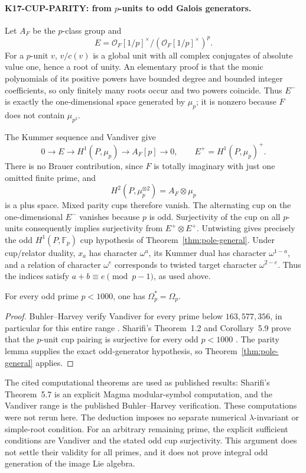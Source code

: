\paragraph{K17-CUP-PARITY: from $p$-units to odd Galois generators.}
Let $A_F$ be the $p$-class group and
\[
 E=\mathcal O_F[1/p]^\times/(\mathcal O_F[1/p]^\times)^p.
\]
For a $p$-unit $v$, $v/c(v)$ is a global unit with all complex conjugates of absolute value one, hence a root of unity. An elementary proof is that the monic polynomials of its positive powers have bounded degree and bounded integer coefficients, so only finitely many roots occur and two powers coincide. Thus $E^-$ is exactly the one-dimensional space generated by $\mu_p$; it is nonzero because $F$ does not contain $\mu_{p^2}$.

The Kummer sequence and Vandiver give
\[
 0\longrightarrow E\longrightarrow H^1(P,\mu_p)
  \longrightarrow A_F[p]\longrightarrow0,
 \qquad E^+=H^1(P,\mu_p)^+.
\]
There is no Brauer contribution, since $F$ is totally imaginary with just one omitted finite prime, and
\[
 H^2(P,\mu_p^{\otimes2})=A_F\otimes\mu_p
\]
is a plus space. Mixed parity cups therefore vanish. The alternating cup on the one-dimensional $E^-$ vanishes because $p$ is odd. Surjectivity of the cup on all $p$-units consequently implies surjectivity from $E^+\otimes E^+$. Untwisting gives precisely the odd $H^1(P,\mathbb F_p)$ cup hypothesis of Theorem~\ref{thm:pole-general}. Under cup/relator duality, $x_a$ has character $\omega^a$, its Kummer dual has character $\omega^{1-a}$, and a relation of character $\omega^e$ corresponds to twisted target character $\omega^{2-e}$. Thus the indices satisfy $a+b\equiv e\pmod{p-1}$, as used above.

\begin{corollary}[K17-KERNEL-LT1000]\label{cor:kernel-lt1000}
For every odd prime $p<1000$, one has $\Omega_p^*=\Omega_p$.
\end{corollary}
\begin{proof}
Buhler--Harvey verify Vandiver for every prime below $163{,}577{,}356$, in particular for this entire range \cite[abstract and \S1, p.~1]{BuhlerHarvey2011}. Sharifi's Theorem~1.2 and Corollary~5.9 prove that the $p$-unit cup pairing is surjective for every odd $p<1000$ \cite[pp.~2 and~27]{Sharifi2007}. The parity lemma supplies the exact odd-generator hypothesis, so Theorem~\ref{thm:pole-general} applies.
\end{proof}

The cited computational theorems are used as published results: Sharifi's Theorem~5.7 is an explicit Magma modular-symbol computation, and the Vandiver range is the published Buhler--Harvey verification. These computations were not rerun here. The deduction imposes no separate numerical $\lambda$-invariant or simple-root condition. For an arbitrary remaining prime, the explicit sufficient conditions are Vandiver and the stated odd cup surjectivity. This argument does not settle their validity for all primes, and it does not prove integral odd generation of the image Lie algebra.
